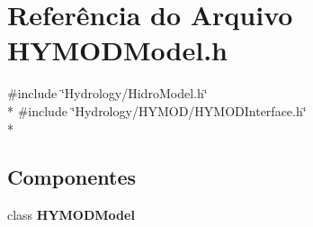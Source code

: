 \section{Referência do Arquivo H\+Y\+M\+O\+D\+Model.\+h}
\label{_h_y_m_o_d_model_8h}
{\ttfamily \#include \char`\"{}Hydrology/\+Hidro\+Model.\+h\char`\"{}}\\*
{\ttfamily \#include \char`\"{}Hydrology/\+H\+Y\+M\+O\+D/\+H\+Y\+M\+O\+D\+Interface.\+h\char`\"{}}\\*
\subsection*{Componentes}
\begin{DoxyCompactItemize}
\item 
class {\bf H\+Y\+M\+O\+D\+Model}
\end{DoxyCompactItemize}
